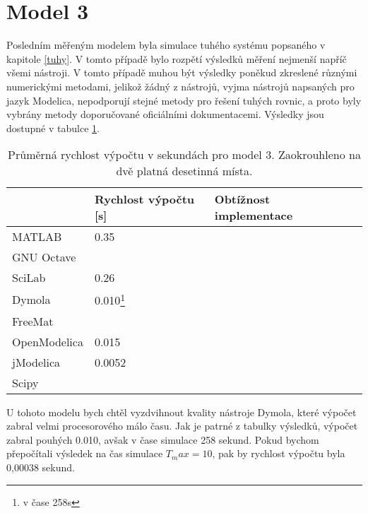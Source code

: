 

\section{Model 3}
\label{srovnani-tuhy}
Posledním měřeným modelem byla simulace tuhého systému popsaného v kapitole \ref{tuhy}. V tomto případě bylo rozpětí výsledků měření nejmenší napříč všemi nástroji. V tomto případě muhou být výsledky poněkud zkreslené různými numerickými metodami, jelikož žádný z nástrojů, vyjma nástrojů napsaných pro jazyk Modelica, nepodporují stejné metody pro řešení tuhých rovnic, a proto byly vybrány metody doporučované oficiálními dokumentacemi. Výsledky jsou dostupné v tabulce \ref{tab:tuhy-tabulka}.
\begin{savenotes}
\begin{table}[ht]
\centering
\begin{tabular}{|l|l|l|l|}
\hline
             & Rychlost výpočtu {[}s{]} & Obtížnost implementace &  \\ \hline
MATLAB       &         0.35                 &  &  \\ \hline
GNU Octave   &                          &  &  \\ \hline
SciLab       &          0.26                &  &  \\ \hline
Dymola       &        0.010\footnote{v čase 258s}                  &  &  \\ \hline
FreeMat &                          &  &  \\ \hline
OpenModelica    &     0.015                     &  &  \\ \hline
jModelica        &    0.0052                      &  &  \\ \hline
 Scipy            &                          &  &  \\ \hline
\end{tabular}
\caption{Průměrná rychlost výpočtu v sekundách pro model 3. Zaokrouhleno na dvě platná desetinná místa.}
\label{tab:tuhy-tabulka}
\end{table}
\end{savenotes}

U tohoto modelu bych chtěl vyzdvihnout kvality nástroje Dymola, které výpočet zabral velmi procesorového málo času. Jak je patrné z tabulky výsledků, výpočet zabral pouhých 0.010, avšak v čase simulace 258 sekund. Pokud bychom přepočítali výsledek na čas simulace $T_max = 10$, pak by rychlost výpočtu byla 0,00038 sekund.


